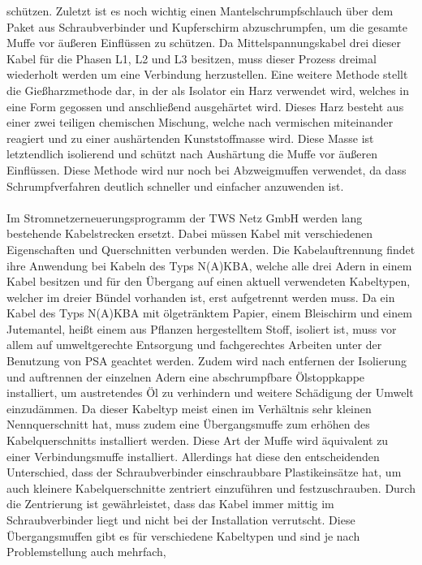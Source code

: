 schützen. Zuletzt ist es noch wichtig einen Mantelschrumpfschlauch über dem Paket aus Schraubverbinder und Kupferschirm abzuschrumpfen, um die gesamte Muffe 
vor äußeren Einflüssen zu schützen. Da Mittelspannungskabel drei dieser Kabel für die Phasen L1, L2 und L3 besitzen, muss dieser Prozess dreimal wiederholt 
werden um eine Verbindung herzustellen. Eine weitere Methode stellt die Gießharzmethode dar, in der als Isolator ein Harz verwendet wird, welches in eine Form 
gegossen und anschließend ausgehärtet wird. Dieses Harz besteht aus einer zwei teiligen chemischen Mischung, welche nach vermischen miteinander reagiert und 
zu einer aushärtenden Kunststoffmasse wird. Diese Masse ist letztendlich isolierend und schützt nach Aushärtung die Muffe vor äußeren Einflüssen. Diese Methode 
wird nur noch bei Abzweigmuffen verwendet, da dass Schrumpfverfahren deutlich schneller und einfacher anzuwenden ist. \autocite{Cellpack}
\\\\
Im Stromnetzerneuerungsprogramm der TWS Netz GmbH werden lang bestehende Kabelstrecken ersetzt. Dabei müssen Kabel mit verschiedenen Eigenschaften und 
Querschnitten verbunden werden. 
Die Kabelauftrennung findet ihre Anwendung bei Kabeln des Typs N(A)KBA, welche alle drei Adern in einem Kabel besitzen und für den Übergang auf einen aktuell 
verwendeten Kabeltypen, welcher im dreier Bündel vorhanden ist, erst aufgetrennt werden muss. Da ein Kabel des Typs N(A)KBA mit ölgetränktem Papier, einem 
Bleischirm und einem Jutemantel, heißt einem aus Pflanzen hergestelltem Stoff, isoliert ist, muss vor allem auf umweltgerechte Entsorgung und fachgerechtes 
Arbeiten unter der Benutzung von PSA geachtet werden. Zudem wird nach entfernen der Isolierung und auftrennen der einzelnen Adern eine abschrumpfbare 
Ölstoppkappe installiert, um austretendes Öl zu verhindern und weitere Schädigung der Umwelt einzudämmen. Da dieser Kabeltyp meist einen im Verhältnis sehr 
kleinen Nennquerschnitt hat, muss zudem eine Übergangsmuffe zum erhöhen des Kabelquerschnitts installiert werden. Diese Art der Muffe wird äquivalent zu 
einer Verbindungsmuffe installiert. Allerdings hat diese den entscheidenden Unterschied, dass der Schraubverbinder einschraubbare Plastikeinsätze hat, um auch 
kleinere Kabelquerschnitte zentriert einzuführen und festzuschrauben. Durch die Zentrierung ist gewährleistet, dass das Kabel immer mittig im Schraubverbinder 
liegt und nicht bei der Installation verrutscht. Diese Übergangsmuffen gibt es für verschiedene Kabeltypen und sind je nach Problemstellung auch mehrfach, \zB 
